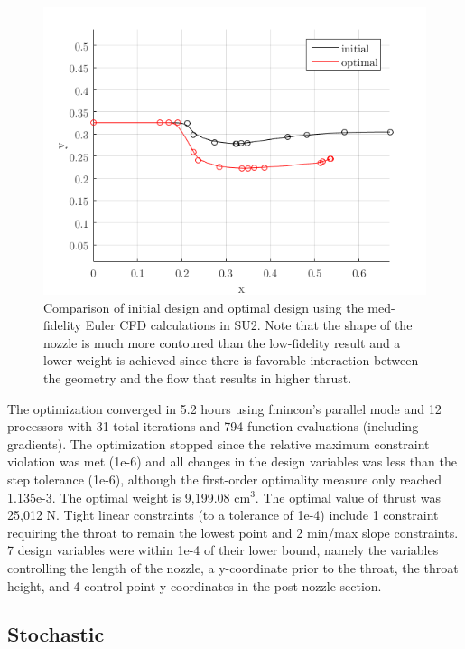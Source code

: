 \documentclass{article}
\begin{document}
\begin{figure}
\caption{Comparison of initial design and optimal design using the med-fidelity Euler CFD calculations in SU2. Note that the shape of the nozzle is much more contoured than the low-fidelity result and a lower weight is achieved since there is favorable interaction between the geometry and the flow that results in higher thrust.}
\label{fig:minWeightMedfiSimpleResults}
\begin{center}
\includegraphics[scale=0.5]{figs/det_medfi_result.png}
\end{center}
\end{figure}

The optimization converged in 5.2 hours using fmincon's parallel mode and 12 processors with 31 total iterations and 794 function evaluations (including gradients). The optimization stopped since the relative maximum constraint violation was met (1e-6) and all changes in the design variables was less than the step tolerance (1e-6), although the first-order optimality measure only reached 1.135e-3. The optimal weight is 9,199.08 $\textrm{cm}^3$. The optimal value of thrust was 25,012 N. Tight linear constraints (to a tolerance of 1e-4) include 1 constraint requiring the throat to remain the lowest point and 2 min/max slope constraints. 7 design variables were within 1e-4 of their lower bound, namely the variables controlling the length of the nozzle, a y-coordinate prior to the throat, the throat height, and 4 control point y-coordinates in the post-nozzle section.

\subsection{Stochastic}
\end{document}
